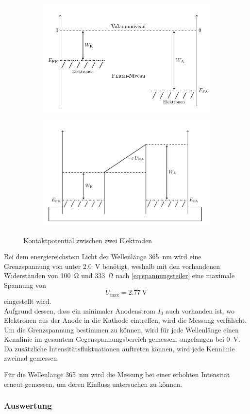 \begin{figure}[htb]
	\centering
	\begin{subfigure}[c]{0.46\linewidth}
        \includegraphics[width=\linewidth]{../figs/fermi1.png}
    \end{subfigure}
	\begin{subfigure}[c]{0.46\linewidth}
        \includegraphics[width=\linewidth]{../figs/fermi2.png}
    \end{subfigure}
	\caption{Kontaktpotential zwischen zwei Elektroden}
\end{figure}

Bei dem energiereichstem Licht der Wellenlänge \SI{365}{\nano\meter} wird eine Grenzspannung von unter 
\SI{2.0}{\volt} benötigt, weshalb mit den vorhandenen Widerständen von \SI{100}{\ohm} und \SI{333}{\ohm}
nach \cref{eq:spannungsteiler} eine maximale Spannung von 
\[U_\mathrm{max} = \SI{2.77}{\volt}\]
eingestellt wird.\\
Aufgrund dessen, dass ein minimaler Anodenstrom $I_0$ auch vorhanden ist, wo Elektronen aus der 
Anode in die Kathode eintreffen, wird die Messung verfälscht. Um die Grenzspannung bestimmen zu können, 
wird für jede Wellenlänge einen Kennlinie im gesamtem Gegenspannungsbereich gemessen, angefangen 
bei \SI{0}{\volt}. Da zusätzliche Intensitätsfluktuationen auftreten können, wird jede Kennlinie 
zweimal gemessen.\\\par
Für die Wellenlänge \SI{365}{\nano\meter} wird die Messung bei einer erhöhten Intensität 
erneut gemessen, um deren Einfluss untersuchen zu können.

\subsubsection{Auswertung}